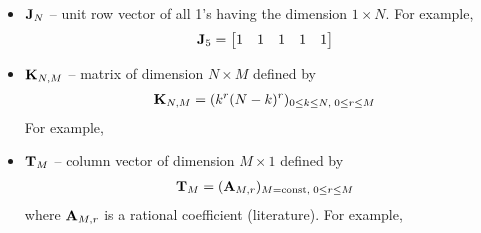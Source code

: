 ﻿\begin{itemize}
    \item ${\mathbf{J}} \sb{N}$ -- unit row vector of all 1's having the dimension $1 \times N$.
    For example,
    \begin{align*}
        {\mathbf{J}} \sb{5} =
        \begin{bmatrix}
            1 & 1 & 1 & 1 & 1
        \end{bmatrix}
    \end{align*}
    \item ${\mathbf{K}} \sb{N, M}$ -- matrix of dimension $N \times M$ defined by
    \begin{align*}
        {\mathbf{K}} \sb{N, M} = (k^r (N-k)^r)_{0 \leq k \leq N, \; 0 \leq r \leq M}
    \end{align*}
    For example,
    \item ${\mathbf{T}} \sb{M}$ -- column vector of dimension $M \times 1$ defined by
    \begin{align*}
        {\mathbf{T}} \sb{M} = ({\mathbf{A}} \sb{M,r})_{M=\mathrm{const}, \; 0 \leq r \leq M}
    \end{align*}
    where ${\mathbf{A}} \sb{M,r}$ is a rational coefficient (literature).
    For example,
\end{itemize}

